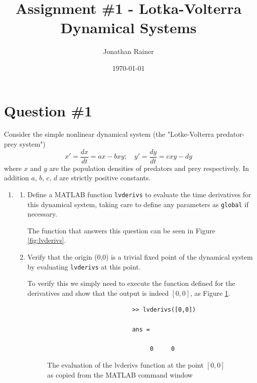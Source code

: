 \documentclass[11pt]{report}
\title{Assignment \#1 - Lotka-Volterra Dynamical Systems}
\date{\today}
\author{Jonathan Rainer}
\begin{document}
	\fancyhf{}
	\chead{\thepage}
	\rhead{\today}
	\renewcommand{\headrulewidth}{0.3pt}
	\renewcommand{\footrulewidth}{0.3pt}
	\maketitle
	
	\chapter*{Question \#1}
	Consider the simple nonlinear dynamical system (the "Lotke-Volterra predator-prey system")
	$$
	x' = \dfrac{dx}{dt} = ax - bxy ; \quad y' = \dfrac{dy}{dt} = cxy - dy
	$$
	where $x$ and $y$ are the population densities of predators and prey respectively. In addition $a$, $b$, $c$, $d$ are strictly positive constants.
	\begin{enumerate}[label=\alph*)]
		\item 
			\begin{enumerate}[label=\roman*)]
				\item Define a MATLAB function \texttt{lvderivs} to evaluate the time derivatives for this dynamical system, taking care to define any parameters as \texttt{global} if necessary.
				
				The function that answers this question can be seen in Figure \ref{fig:lvderivs}.
				
				\item Verify that the origin (0,0) is a trivial fixed point of the dynamical system by evaluating \texttt{lvderivs} at this point.
				
				To verify this we simply need to execute the function defined for the derivatives and show that the output is indeed $[0,0]$, as Figure \ref{fig:lvderivs_trivial_output}.
				
				\begin{figure}[h]
					\begin{framed}
						\begin{verbatim}
						>> lvderivs([0,0])
						
						ans =
						
							 0     0
						\end{verbatim}
					\end{framed}
					\caption{The evaluation of the lvderivs function at the point $[0,0]$ as copied from the MATLAB command window}
					\label{fig:lvderivs_trivial_output}
				\end{figure}
				

\end{enumerate}
\end{enumerate}
\end{document}
